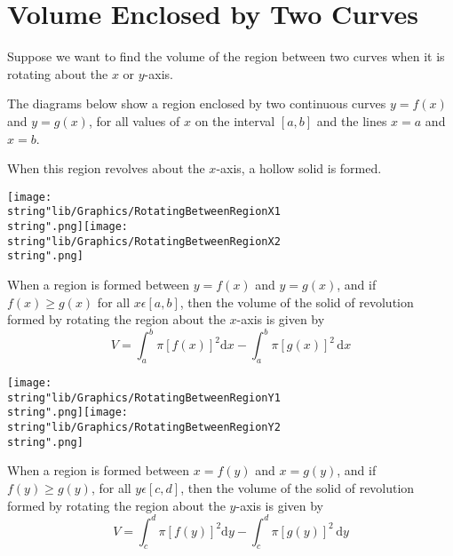 \documentclass[11pt,a4paper]{book}
\begin{document}
\newpage

\section{Volume Enclosed by Two Curves}

Suppose we want to find the volume of the region between two curves
when it is rotating about the $x$ or $y$-axis.

The diagrams below show a region enclosed by two continuous curves
$y=f(x)$ and $y=g(x)$, for all values of $x$ on the interval $[a,b]$
and the lines $x=a$ and $x=b$.

When this region revolves about the $x$-axis, a hollow solid is formed.
\begin{center}
\texttt{[image: \\string"lib/Graphics/RotatingBetweenRegionX1\\string".png]}\hspace{2cm}\texttt{[image: \\string"lib/Graphics/RotatingBetweenRegionX2\\string".png]}
\par\end{center}

\begin{tcolorbox}[colback=blue!5, colframe=black, boxrule=.4pt, sharpish corners]
When a region is formed between $y=f(x)$ and $y=g(x)$, and if $f(x)\geq g(x)$ for all $x\epsilon[a,b]$, then the volume of the solid of revolution formed by rotating the region about the $x$-axis is given by
\[ V=\int_{a}^{b}\pi[f(x)]^{2}\mathrm{d}x-\int_{a}^{b}\pi[g(x)]^{2}\,\mathrm{d}x \]
\end{tcolorbox}
\begin{center}
\texttt{[image: \\string"lib/Graphics/RotatingBetweenRegionY1\\string".png]}\hspace{2cm}\texttt{[image: \\string"lib/Graphics/RotatingBetweenRegionY2\\string".png]}
\par\end{center}

\begin{tcolorbox}[colback=blue!5, colframe=black, boxrule=.4pt, sharpish corners]
When a region is formed between $x=f(y)$ and $x=g(y)$, and if $f(y)\geq g(y)$, for all $y\epsilon[c,d]$, then the volume of the solid of revolution formed by rotating the region about the $y$-axis is given by
\[ V=\int_{c}^{d}\pi[f(y)]^{2}\mathrm{d}y-\int_{c}^{d}\pi[g(y)]^{2}\,\mathrm{d}y \]
\end{tcolorbox}

\newpage{}
\end{document}
